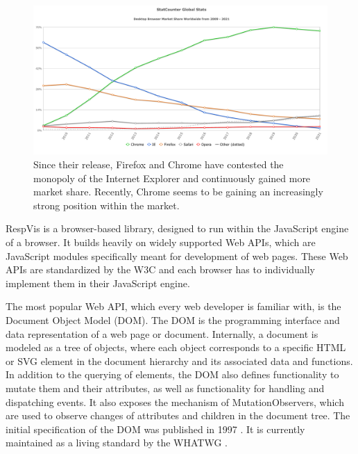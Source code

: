 \begin{figure}[tp]
\centering
\includegraphics[keepaspectratio,width=\linewidth,height=\fullh / 3]{diagrams/browser-market-share.pdf}
\caption[Desktop Browser Market Share]{ Since their release, Firefox
  and Chrome have contested the monopoly of the Internet Explorer and
  continuously gained more market share. Recently, Chrome seems to be
  gaining an increasingly strong position within the market.
  }
\label{fig:BrowserMarketShare}
\end{figure}


RespVis is a browser-based library, designed to run within the
JavaScript engine of a browser. It builds heavily on widely supported
Web APIs, which are JavaScript modules specifically meant for
development of web pages. These Web APIs are standardized by the W3C
and each browser has to individually implement them in their
JavaScript engine.

The most popular Web API, which every web developer is familiar with,
is the Document Object Model (DOM). The DOM is the programming
interface and data representation of a web page or document.
Internally, a document is modeled as a tree of objects, where each
object corresponds to a specific HTML or SVG element in the document
hierarchy and its associated data and functions. In addition to the
querying of elements, the DOM also defines functionality to mutate
them and their attributes, as well as functionality for handling and
dispatching events. It also exposes the mechanism of
MutationObservers, which are used to observe changes of
attributes and children in the document tree. The initial
specification of the DOM was published in 1997 \parencite{DOM1}. It
is currently maintained as a living standard by the WHATWG
\parencite{DOM}.

